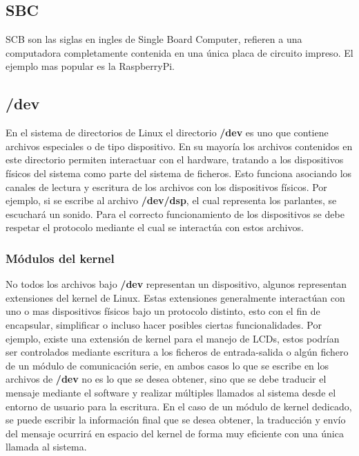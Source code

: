 \documentclass[12pt,letterpaper]{article}     %
\begin{document}
\subsection{SBC}

SCB son las siglas en ingles de Single Board Computer, refieren a una computadora completamente contenida en una
única placa de circuito impreso. El ejemplo mas popular es la RaspberryPi.

\subsection{/dev}

En el sistema de directorios de Linux el directorio \textbf{/dev} es uno que contiene archivos especiales 
o de tipo dispositivo. En su mayoría los archivos contenidos en este directorio permiten interactuar con el
hardware, tratando a los dispositivos físicos del sistema como parte del sistema de ficheros. Esto funciona 
asociando los canales de lectura y escritura de los archivos con los dispositivos físicos. Por ejemplo,
si se escribe al archivo \textbf{/dev/dsp}, el cual representa los parlantes, se escuchará un sonido. Para el correcto
funcionamiento de los dispositivos se debe respetar el protocolo mediante el cual se interactúa con estos archivos.

\subsubsection{Módulos del kernel}

No todos los archivos bajo \textbf{/dev} representan un dispositivo, algunos representan extensiones del kernel de Linux.
Estas extensiones generalmente interactúan con uno o mas dispositivos físicos bajo un protocolo distinto, esto
con el fin de encapsular, simplificar o incluso hacer posibles ciertas funcionalidades. Por ejemplo,
existe una extensión de kernel para el manejo de LCDs, estos podrían ser controlados mediante escritura a los
ficheros de entrada-salida o algún fichero de un módulo de comunicación serie, en ambos casos lo que se 
escribe en los archivos de \textbf{/dev} no es lo que se desea obtener, sino que se debe traducir el mensaje mediante el
software y realizar múltiples llamados al sistema desde el entorno de usuario para la escritura. En el caso de un
módulo de kernel dedicado, se puede escribir la información final que se desea obtener, la traducción y envío del
mensaje ocurrirá en espacio del kernel de forma muy eficiente con una única llamada al sistema. 
\end{document}
